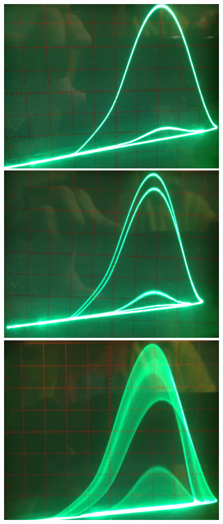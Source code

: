 \documentclass{scrartcl}
\begin{document}
\begin{figure}[!htbp]
\centering
\includegraphics[scale=0.05]{800khz-134V-phase}
\includegraphics[scale=0.055]{800khz-112V-phase}
\includegraphics[scale=0.06]{800khz-29,6V-phase-chaos}

\end{figure}
\end{document}
